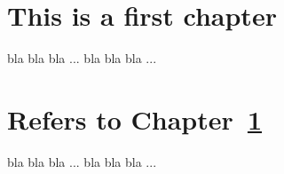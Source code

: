 \documentclass{book}
\begin{document}
\tableofcontents
\chapter{This is a first chapter} \label{chap1}
bla bla bla ... \newpage
bla bla bla ...
\chapter{Refers to Chapter~\ref{chap1}}
bla bla bla ... \newpage
bla bla bla ...
\end{document}
